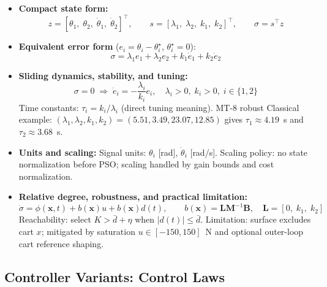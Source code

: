 \documentclass[10pt, a4paper]{article}
\newcommand{\vx}{\boldsymbol{x}}
\begin{document}
\begin{itemize}[leftmargin=1.5em,itemsep=0.2em]
  \item \textbf{Compact state form:}
  \begin{equation}
    z = [\theta_1,\; \theta_2,\; \dot{\theta}_1,\; \dot{\theta}_2]^\top,\qquad
    s = [\lambda_1,\; \lambda_2,\; k_1,\; k_2]^\top,\qquad
    \sigma = s^\top z
    \label{eq:surface}
  \end{equation}

  \item \textbf{Equivalent error form} ($e_i=\theta_i-\theta_i^\star$, $\theta_i^\star=0$):
  \begin{equation}
    \sigma = \lambda_1 e_1 + \lambda_2 e_2 + k_1\dot{e}_1 + k_2\dot{e}_2
  \end{equation}

  \item \textbf{Sliding dynamics, stability, and tuning:}
  \begin{equation}
    \sigma=0 \;\Rightarrow\; \dot{e}_i = -\frac{\lambda_i}{k_i}e_i,\quad
    \lambda_i>0,\;k_i>0,\; i\in\{1,2\}
    \label{eq:stability_cond}
  \end{equation}
  Time constants: $\tau_i = k_i/\lambda_i$ (direct tuning meaning).
  MT-8 robust Classical example: $(\lambda_1,\lambda_2,k_1,k_2)=(5.51,3.49,23.07,12.85)$
  gives $\tau_1\approx4.19$~s and $\tau_2\approx3.68$~s.

  \item \textbf{Units and scaling:}
  Signal units: $\theta_i$ [rad], $\dot{\theta}_i$ [rad/s].
  Scaling policy: no state normalization before PSO; scaling handled by gain bounds
  and cost normalization.

  \item \textbf{Relative degree, robustness, and practical limitation:}
  \begin{equation}
    \dot{\sigma} = \phi(\vx,t) + b(\vx)u + b(\vx)d(t), \qquad
    b(\vx)=\mathbf{L}\mathbf{M}^{-1}\mathbf{B},\quad
    \mathbf{L}=[0,\;k_1,\;k_2]
  \end{equation}
  Reachability: select $K>\bar{d}+\eta$ when $|d(t)|\le\bar{d}$.
  Limitation: surface excludes cart $x$; mitigated by saturation $u\in[-150,150]$~N
  and optional outer-loop cart reference shaping.
\end{itemize}

\subsection{Controller Variants: Control Laws}
\end{document}
